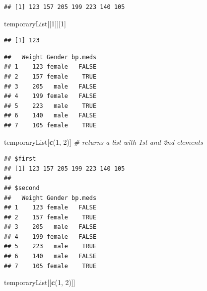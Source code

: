 \documentclass[]{article}
\newenvironment{Shaded}{\begin{snugshade}}{\end{snugshade}}
\newcommand{\KeywordTok}[1]{\textcolor[rgb]{0.13,0.29,0.53}{\textbf{#1}}}
\newcommand{\DecValTok}[1]{\textcolor[rgb]{0.00,0.00,0.81}{#1}}
\newcommand{\CommentTok}[1]{\textcolor[rgb]{0.56,0.35,0.01}{\textit{#1}}}
\newcommand{\OperatorTok}[1]{\textcolor[rgb]{0.81,0.36,0.00}{\textbf{#1}}}
\newcommand{\NormalTok}[1]{#1}
\begin{document}
\begin{verbatim}
## [1] 123 157 205 199 223 140 105
\end{verbatim}

\begin{Shaded}
\begin{Highlighting}[]
\NormalTok{temporaryList[[}\DecValTok{1}\NormalTok{]][}\DecValTok{1}\NormalTok{]}
\end{Highlighting}
\end{Shaded}

\begin{verbatim}
## [1] 123
\end{verbatim}

\begin{Shaded}
\end{Shaded}

\begin{verbatim}
##   Weight Gender bp.meds
## 1    123 female   FALSE
## 2    157 female    TRUE
## 3    205   male   FALSE
## 4    199 female   FALSE
## 5    223   male    TRUE
## 6    140   male   FALSE
## 7    105 female    TRUE
\end{verbatim}

\begin{Shaded}
\begin{Highlighting}[]
\NormalTok{temporaryList[}\KeywordTok{c}\NormalTok{(}\DecValTok{1}\NormalTok{, }\DecValTok{2}\NormalTok{)] }\CommentTok{# returns a list with 1st and 2nd elements}
\end{Highlighting}
\end{Shaded}

\begin{verbatim}
## $first
## [1] 123 157 205 199 223 140 105
## 
## $second
##   Weight Gender bp.meds
## 1    123 female   FALSE
## 2    157 female    TRUE
## 3    205   male   FALSE
## 4    199 female   FALSE
## 5    223   male    TRUE
## 6    140   male   FALSE
## 7    105 female    TRUE
\end{verbatim}

\begin{Shaded}
\begin{Highlighting}[]
\NormalTok{temporaryList[[}\KeywordTok{c}\NormalTok{(}\DecValTok{1}\NormalTok{, }\DecValTok{2}\NormalTok{)]]}
\end{Highlighting}
\end{Shaded}
\end{document}
